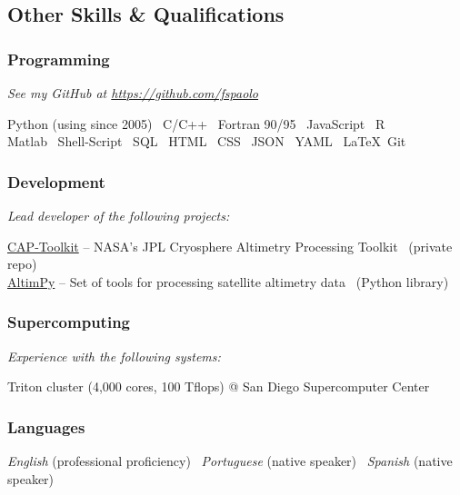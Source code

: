 \documentclass[12pt,]{scrartcl}
\begin{document}
\subsection{Other Skills \& Qualifications}

\subsubsection{Programming}

\emph{See my GitHub at \url{https://github.com/fspaolo}}

Python (using since 2005) \, C/C++ \, Fortran 90/95 \, JavaScript \, R \\
Matlab \, Shell-Script \, SQL \, HTML \, CSS \, JSON \, YAML \, \LaTeX \, Git

\subsubsection{Development}

\emph{Lead developer of the following projects:}

\href{https://#}{CAP-Toolkit} -- NASA's JPL Cryosphere Altimetry Processing Toolkit {\small \ (private repo)} \\
\href{https://github.com/fspaolo/altimpy}{AltimPy} -- Set of tools for processing satellite altimetry data {\small \ (Python library)} \\



\subsubsection{Supercomputing}

\emph{Experience with the following systems:}

Triton cluster (4,000 cores, 100 Tflops) @ San Diego Supercomputer Center \\



\subsubsection{Languages}

\textit{English} (professional proficiency) \, \textit{Portuguese} (native speaker) \, \textit{Spanish} (native speaker) \\

\end{document}
